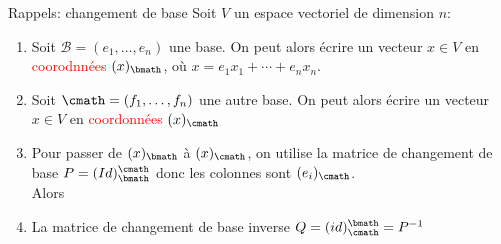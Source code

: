 
\begin{parag}{Rappels: changement de base}
    Soit $V$ un espace vectoriel de dimension $n$:
    \begin{enumerate}
        \item Soit $\mathcal{B} = (e_1, \dots, e_n)$ une base. On peut alors écrire un vecteur $x \in V$ en \textcolor{red}{coorodnnées} $(x)_\bmath$, où $x = e_1x_1 + \cdots + e_nx_n$.
        \item Soit $\cmath = (f_1, \dots, f_n)$ une autre base. On peut alors écrire un vecteur $x \in V$ en \textcolor{red}{coordonnées} $(x)_\cmath$
        \item Pour passer de $(x)_\bmath$ à $(x)_\cmath$, on utilise la matrice de changement de base $P = (Id)_\bmath^\cmath$ donc les colonnes sont $(e_i)_\cmath$.
        \\
        Alors
        \item La matrice de changement de base inverse $Q = (id)_\cmath^\bmath = P^{-1}$
    \end{enumerate}




\end{parag}
